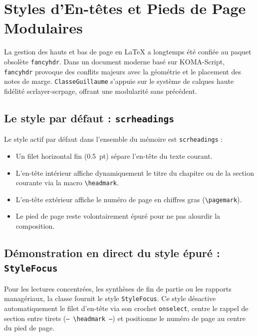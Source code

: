 \section{Styles d'En-têtes et Pieds de Page Modulaires}
\label{sec:styles_en_tetes_pieds}

La gestion des hauts et bas de page en \LaTeX{} a longtemps été confiée au paquet obsolète \texttt{fancyhdr}.
Dans un document moderne basé sur KOMA-Script, \texttt{fancyhdr} provoque des conflits majeurs avec la géométrie et le placement des notes de marge.
\texttt{ClasseGuillaume} s'appuie sur le système de calques haute fidélité \textsf{scrlayer-scrpage}, offrant une modularité sans précédent.

\subsection{Le style par défaut : \texttt{scrheadings}}
\label{subsec:style_scrheadings}

Le style actif par défaut dans l'ensemble du mémoire est \texttt{scrheadings} :
\begin{itemize}
  \item Un filet horizontal fin (\qty{0.5}{pt}) sépare l'en-tête du texte courant.
  \item L'en-tête intérieur affiche dynamiquement le titre du chapitre ou de la section courante via la macro \texttt{\textbackslash headmark}.
  \item L'en-tête extérieur affiche le numéro de page en chiffres gras (\texttt{\textbackslash pagemark}).
  \item Le pied de page reste volontairement épuré pour ne pas alourdir la composition.
\end{itemize}

\clearpage
\begingroup
\pagestyle{StyleFocus}

\subsection{Démonstration en direct du style épuré : \texttt{StyleFocus}}
\label{subsec:style_focus}

Pour les lectures concentrées, les synthèses de fin de partie ou les rapports managériaux, la classe fournit le style \texttt{StyleFocus}.
Ce style désactive automatiquement le filet d'en-tête via son crochet \texttt{onselect}, centre le rappel de section entre tirets (\texttt{-- \textbackslash headmark{} --}) et positionne le numéro de page au centre du pied de page.

